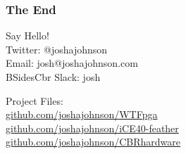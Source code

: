\documentclass[t]{beamer}
\begin{document}

\begin{frame}
\frametitle{The End}
Say Hello! \\
Twitter:  @\textunderscore joshajohnson\\
Email: josh@joshajohnson.com\\
BSidesCbr Slack: josh\\
\vspace{4mm}

Project Files: \\
\url{github.com/joshajohnson/WTFpga}\\
\url{github.com/joshajohnson/iCE40-feather}\\
\url{github.com/joshajohnson/CBRhardware}\\

\end{frame}
\end{document}
